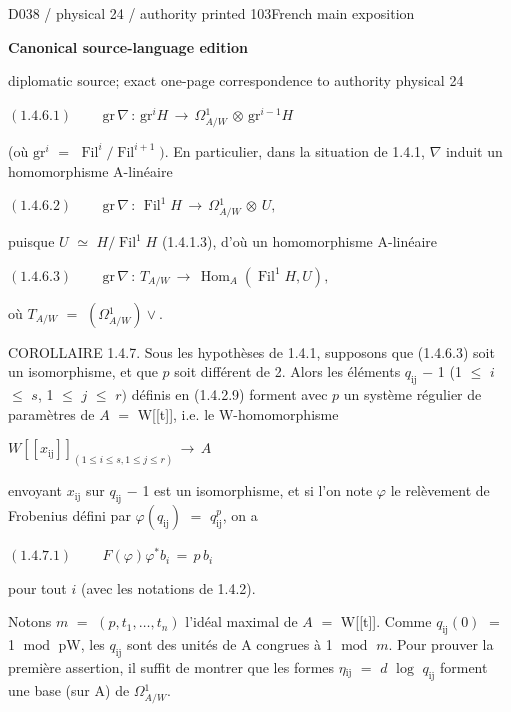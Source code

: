 \documentclass[9pt]{article}
\newcommand{\CanonText}[1]{\par{\fontsize{8.0}{9.35}\selectfont\RaggedRight #1\par}\vspace{2.2pt}}
\newcommand{\CanonDisplay}[1]{\par\vspace{1.2pt}\begin{center}{\fontsize{7.2}{8.4}\selectfont\(\displaystyle #1\)}\end{center}\vspace{1.2pt}}
\newcommand{\LayerTitle}{Canonical source-language edition}
\begin{document}
\noindent\begin{minipage}[t][\dimexpr\textheight-5pt\relax][t]{\textwidth}
{\sffamily\fontsize{7.3}{8.2}\selectfont\color{Quiet} D038 / physical 24 / authority printed 103\hfill French main exposition}
\par{}\vspace{4.5pt}
{\sffamily\fontsize{10.4}{11.6}\selectfont\bfseries\color{Accent} \LayerTitle}
\par{\sffamily\fontsize{6.7}{7.7}\selectfont\color{Quiet} diplomatic source; exact one-page correspondence to authority physical 24}
\vspace{5pt}
\CanonDisplay{(1.4.6.1)\qquad\,\text{gr}\,\nabla{}\,:\,\text{gr}^{i}H\,\to{}\,\Omega{}^{1}_{A/W}\,\otimes{}\,\text{gr}^{i-1}H}
\CanonText{(où \(\text{gr}^{i}\) \(=\) \(\operatorname{Fil}^{i}/\operatorname{Fil}^{i+1})\). En particulier, dans la situation de 1.4.1, \(\nabla{}\) induit un homomorphisme A-linéaire}
\CanonDisplay{(1.4.6.2)\qquad\,\text{gr}\,\nabla{}\,:\,\operatorname{Fil}^{1}H\,\to{}\,\Omega{}^{1}_{A/W}\,\otimes{}\,U,}
\CanonText{puisque \(U\) \(\simeq{}\) \(H/\operatorname{Fil}^{1}H\) (1.4.1.3), d'où un homomorphisme A-linéaire}
\CanonDisplay{(1.4.6.3)\qquad\,\text{gr}\,\nabla{}\,:\,T_{A/W}\,\to{}\,\operatorname{Hom}_{A}(\operatorname{Fil}^{1}H,U),}
\CanonText{où \(T_{A/W}\) \(=\) \((\Omega{}^{1}_{A/W})\vee{}\).}
\CanonText{COROLLAIRE 1.4.7. Sous les hypothèses de 1.4.1, supposons que (1.4.6.3) soit un isomorphisme, et que \(p\) soit différent de 2. Alors les éléments \(q_{\mathrm{ij}}\) \(-\) 1 (1 \(\leq{}\) \(i\) \(\leq{}\) \(s\), 1 \(\leq{}\) \(j\) \(\leq{}\) \(r)\) définis en (1.4.2.9) forment avec \(p\) un système régulier de paramètres de \(A\) \(=\) W[[t]], i.e. le W-homomorphisme}
\CanonDisplay{W[[x_{\mathrm{ij}}]]_{(1\leq{}i\leq{}s,1\leq{}j\leq{}r)}\,\to{}\,A}
\CanonText{envoyant \(x_{\mathrm{ij}}\) sur \(q_{\mathrm{ij}}\) \(-\) 1 est un isomorphisme, et si l'on note \(\varphi{}\) le relèvement de Frobenius défini par \(\varphi{}(q_{\mathrm{ij}})\) \(=\) \(q_{\mathrm{ij}}^{p}\), on a}
\CanonDisplay{(1.4.7.1)\qquad\,F(\varphi{})\varphi{}^{*}b_{i}\,=\,p\,b_{i}}
\CanonText{pour tout \(i\) (avec les notations de 1.4.2).}
\CanonText{Notons \(m\) \(=\) \((p,t_{1},\ldots{},t_{n})\) l'idéal maximal de \(A\) \(=\) W[[t]]. Comme \(q_{\mathrm{ij}}(0)\) \(=\) 1 \(\operatorname{mod}\) pW, les \(q_{\mathrm{ij}}\) sont des unités de A congrues à 1 \(\operatorname{mod}\) \(m\). Pour prouver la première assertion, il suffit de montrer que les formes \(\eta{}_{\mathrm{ij}}\) \(=\) \(d\) \(\operatorname{log}\) \(q_{\mathrm{ij}}\) forment une base (sur A) de \(\Omega{}^{1}_{A/W}\).}

\end{minipage}
\end{document}
